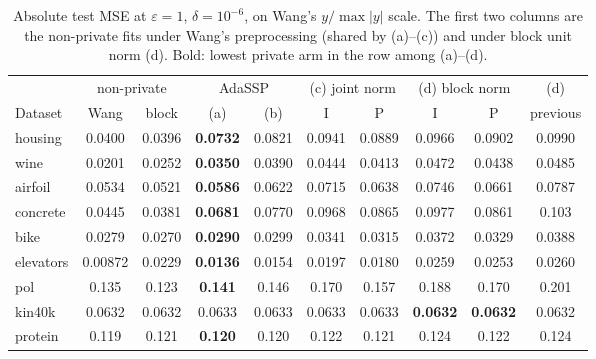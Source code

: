 \documentclass[11pt]{article}
\theoremstyle{definition}
\theoremstyle{plain}
\begin{document}
\begin{table}[t]
  \centering
  \small
  \caption{Absolute test MSE at $\varepsilon = 1$, $\delta = 10^{-6}$, on Wang's $y/\max|y|$ scale. The first two columns are the non-private fits under Wang's preprocessing (shared by (a)--(c)) and under block unit norm (d). Bold: lowest private arm in the row among (a)--(d).}
  \label{tab:adassp_abs_v31}
  \setlength{\tabcolsep}{4pt}
  \begin{tabular}{@{}lccccccccc@{}}
    \toprule
    & \multicolumn{2}{c}{non-private} & \multicolumn{2}{c}{AdaSSP} & \multicolumn{2}{c}{(c) joint norm} & \multicolumn{2}{c}{(d) block norm} & (d) \\
    \cmidrule(lr){2-3} \cmidrule(lr){4-5} \cmidrule(lr){6-7} \cmidrule(lr){8-9}
    Dataset & Wang & block & (a) & (b) & I & P & I & P & previous \\
    \midrule
    housing & 0.0400 & 0.0396 & \textbf{0.0732} & 0.0821 & 0.0941 & 0.0889 & 0.0966 & 0.0902 & 0.0990 \\
    wine & 0.0201 & 0.0252 & \textbf{0.0350} & 0.0390 & 0.0444 & 0.0413 & 0.0472 & 0.0438 & 0.0485 \\
    airfoil & 0.0534 & 0.0521 & \textbf{0.0586} & 0.0622 & 0.0715 & 0.0638 & 0.0746 & 0.0661 & 0.0787 \\
    concrete & 0.0445 & 0.0381 & \textbf{0.0681} & 0.0770 & 0.0968 & 0.0865 & 0.0977 & 0.0861 & 0.103 \\
    bike & 0.0279 & 0.0270 & \textbf{0.0290} & 0.0299 & 0.0341 & 0.0315 & 0.0372 & 0.0329 & 0.0388 \\
    elevators & 0.00872 & 0.0229 & \textbf{0.0136} & 0.0154 & 0.0197 & 0.0180 & 0.0259 & 0.0253 & 0.0260 \\
    pol & 0.135 & 0.123 & \textbf{0.141} & 0.146 & 0.170 & 0.157 & 0.188 & 0.170 & 0.201 \\
    kin40k & 0.0632 & 0.0632 & 0.0633 & 0.0633 & 0.0633 & 0.0633 & \textbf{0.0632} & \textbf{0.0632} & 0.0632 \\
    protein & 0.119 & 0.121 & \textbf{0.120} & 0.120 & 0.122 & 0.121 & 0.124 & 0.122 & 0.124 \\
    \bottomrule
  \end{tabular}
\end{table}
\end{document}
